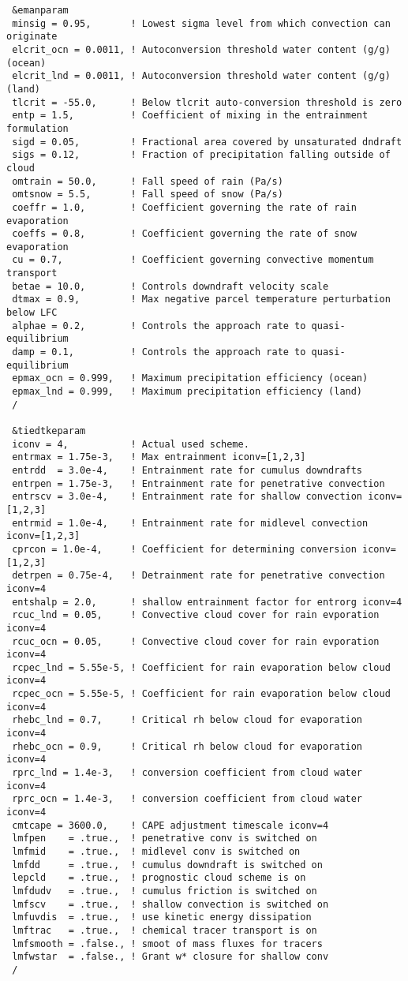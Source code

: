 {\begin{Verbatim}
 &emanparam
 minsig = 0.95,       ! Lowest sigma level from which convection can originate
 elcrit_ocn = 0.0011, ! Autoconversion threshold water content (g/g) (ocean)
 elcrit_lnd = 0.0011, ! Autoconversion threshold water content (g/g) (land)
 tlcrit = -55.0,      ! Below tlcrit auto-conversion threshold is zero
 entp = 1.5,          ! Coefficient of mixing in the entrainment formulation
 sigd = 0.05,         ! Fractional area covered by unsaturated dndraft
 sigs = 0.12,         ! Fraction of precipitation falling outside of cloud
 omtrain = 50.0,      ! Fall speed of rain (Pa/s)
 omtsnow = 5.5,       ! Fall speed of snow (Pa/s)
 coeffr = 1.0,        ! Coefficient governing the rate of rain evaporation
 coeffs = 0.8,        ! Coefficient governing the rate of snow evaporation
 cu = 0.7,            ! Coefficient governing convective momentum transport
 betae = 10.0,        ! Controls downdraft velocity scale
 dtmax = 0.9,         ! Max negative parcel temperature perturbation below LFC
 alphae = 0.2,        ! Controls the approach rate to quasi-equilibrium
 damp = 0.1,          ! Controls the approach rate to quasi-equilibrium
 epmax_ocn = 0.999,   ! Maximum precipitation efficiency (ocean)
 epmax_lnd = 0.999,   ! Maximum precipitation efficiency (land)
 /

 &tiedtkeparam
 iconv = 4,           ! Actual used scheme.
 entrmax = 1.75e-3,   ! Max entrainment iconv=[1,2,3]
 entrdd  = 3.0e-4,    ! Entrainment rate for cumulus downdrafts
 entrpen = 1.75e-3,   ! Entrainment rate for penetrative convection
 entrscv = 3.0e-4,    ! Entrainment rate for shallow convection iconv=[1,2,3]
 entrmid = 1.0e-4,    ! Entrainment rate for midlevel convection iconv=[1,2,3]
 cprcon = 1.0e-4,     ! Coefficient for determining conversion iconv=[1,2,3]
 detrpen = 0.75e-4,   ! Detrainment rate for penetrative convection iconv=4
 entshalp = 2.0,      ! shallow entrainment factor for entrorg iconv=4
 rcuc_lnd = 0.05,     ! Convective cloud cover for rain evporation iconv=4
 rcuc_ocn = 0.05,     ! Convective cloud cover for rain evporation iconv=4
 rcpec_lnd = 5.55e-5, ! Coefficient for rain evaporation below cloud iconv=4
 rcpec_ocn = 5.55e-5, ! Coefficient for rain evaporation below cloud iconv=4
 rhebc_lnd = 0.7,     ! Critical rh below cloud for evaporation iconv=4
 rhebc_ocn = 0.9,     ! Critical rh below cloud for evaporation iconv=4
 rprc_lnd = 1.4e-3,   ! conversion coefficient from cloud water iconv=4
 rprc_ocn = 1.4e-3,   ! conversion coefficient from cloud water iconv=4
 cmtcape = 3600.0,    ! CAPE adjustment timescale iconv=4
 lmfpen    = .true.,  ! penetrative conv is switched on
 lmfmid    = .true.,  ! midlevel conv is switched on
 lmfdd     = .true.,  ! cumulus downdraft is switched on
 lepcld    = .true.,  ! prognostic cloud scheme is on
 lmfdudv   = .true.,  ! cumulus friction is switched on
 lmfscv    = .true.,  ! shallow convection is switched on
 lmfuvdis  = .true.,  ! use kinetic energy dissipation
 lmftrac   = .true.,  ! chemical tracer transport is on
 lmfsmooth = .false., ! smoot of mass fluxes for tracers
 lmfwstar  = .false., ! Grant w* closure for shallow conv
 /


\end{Verbatim}}

